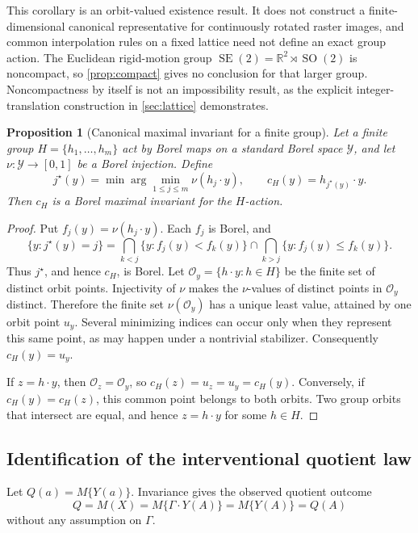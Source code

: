 \documentclass[11pt]{article}
\newtheorem{proposition}[theorem]{Proposition}
\theoremstyle{definition}
\theoremstyle{remark}
\newcommand{\cY}{\mathcal Y}
\newcommand{\bR}{\mathbb R}
\newcommand{\1}{\mathbf 1}
\begin{document}
This corollary is an orbit-valued existence result.  It does not construct a
finite-dimensional canonical representative for continuously rotated raster
images, and common interpolation rules on a fixed lattice need not define an
exact group action.  The Euclidean rigid-motion group
\(\operatorname{SE}(2)=\bR^2\rtimes\operatorname{SO}(2)\) is noncompact, so
\cref{prop:compact} gives no conclusion for that larger group.  Noncompactness
by itself is not an impossibility result, as the explicit integer-translation
construction in \cref{sec:lattice} demonstrates.

\begin{proposition}[Canonical maximal invariant for a finite group]
\label{prop:finite-canonical}
Let a finite group \(H=\{h_1,\ldots,h_m\}\) act by Borel maps on a standard
Borel space \(\cY\), and let \(\nu:\cY\to[0,1]\) be a Borel injection.  Define
\[
 j^\star(y)=\min\arg\min_{1\le j\le m}\nu(h_j\cdot y),
 \qquad c_H(y)=h_{j^\star(y)}\cdot y.
\]
Then \(c_H\) is a Borel maximal invariant for the \(H\)-action.
\end{proposition}

\begin{proof}
Put \(f_j(y)=\nu(h_j\cdot y)\).  Each \(f_j\) is Borel, and
\[
 \{y:j^\star(y)=j\}
 =
 \bigcap_{k<j}\{y:f_j(y)<f_k(y)\}
 \cap
 \bigcap_{k>j}\{y:f_j(y)\le f_k(y)\}.
\]
Thus \(j^\star\), and hence \(c_H\), is Borel.  Let
\(\mathcal O_y=\{h\cdot y:h\in H\}\) be the finite set of distinct orbit
points.  Injectivity of \(\nu\) makes the \(\nu\)-values of distinct points in
\(\mathcal O_y\) distinct.  Therefore the finite set \(\nu(\mathcal O_y)\)
has a unique least value, attained by one orbit point \(u_y\).  Several
minimizing indices can occur only when they represent this same point, as may
happen under a nontrivial stabilizer.  Consequently \(c_H(y)=u_y\).

If \(z=h\cdot y\), then \(\mathcal O_z=\mathcal O_y\), so
\(c_H(z)=u_z=u_y=c_H(y)\).  Conversely, if \(c_H(y)=c_H(z)\), this common
point belongs to both orbits.  Two group orbits that intersect are equal, and
hence \(z=h\cdot y\) for some \(h\in H\).
\end{proof}

\subsection{Identification of the interventional quotient law}

Let \(Q(a)=M\{Y(a)\}\).  Invariance gives the observed quotient outcome
\begin{equation}\label{eq:q-observed}
  Q=M(X)=M\{\Gamma\cdot Y(A)\}=M\{Y(A)\}=Q(A)
\end{equation}
without any assumption on \(\Gamma\).
\end{document}
